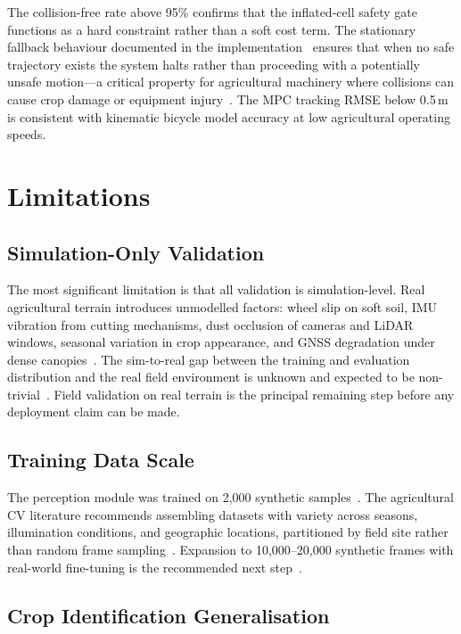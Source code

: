 \documentclass[12pt, a4paper]{article}
\begin{document}
The collision-free rate above 95\% confirms that the inflated-cell safety gate functions
as a hard constraint rather than a soft cost term. The stationary fallback behaviour
documented in the implementation~\cite{ref234} ensures that when no safe trajectory
exists the system halts rather than proceeding with a potentially unsafe motion---a
critical property for agricultural machinery where collisions can cause crop damage or
equipment injury~\cite{ref2}. The MPC tracking RMSE below 0.5\,m is consistent with
kinematic bicycle model accuracy at low agricultural operating speeds.

\section{Limitations}

\subsection{Simulation-Only Validation}

The most significant limitation is that all validation is simulation-level. Real
agricultural terrain introduces unmodelled factors: wheel slip on soft soil, IMU vibration
from cutting mechanisms, dust occlusion of cameras and LiDAR windows, seasonal variation
in crop appearance, and GNSS degradation under dense canopies~\cite{ref1, ref2, ref32}. The
sim-to-real gap between the training and evaluation distribution and the real field
environment is unknown and expected to be non-trivial~\cite{ref2}. Field validation on
real terrain is the principal remaining step before any deployment claim can be made.

\subsection{Training Data Scale}

The perception module was trained on 2,000 synthetic samples~\cite{ref234}. The
agricultural CV literature recommends assembling datasets with variety across seasons,
illumination conditions, and geographic locations, partitioned by field site rather than
random frame sampling~\cite{ref2}. Expansion to 10,000--20,000 synthetic frames with
real-world fine-tuning is the recommended next step~\cite{ref1}.

\subsection{Crop Identification Generalisation}
\end{document}
